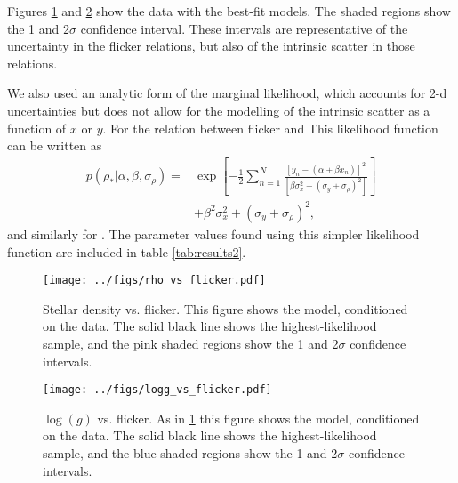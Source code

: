 Figures \ref{fig:rhostar} and \ref{fig:logg} show the data with the best-fit
models.
The shaded regions show the 1 and 2$\sigma$ confidence interval.
These intervals are representative of the uncertainty in the flicker relations,
but also of the intrinsic scatter in those relations.

We also used an analytic form of the marginal likelihood, which accounts for
2-d uncertainties but does not allow for the modelling of the intrinsic scatter
as a function of $x$ or $y$.
For the relation between flicker and \rhostar This likelihood function can be
written as
\begin{eqnarray}
	p(\rho_*|\alpha, \beta, \sigma_{\rho}) = &
	\exp \left[-\frac{1}{2} \sum_{n=1}^N\frac{[y_n-(\alpha + \beta x_n)]^2}
	{\left[\beta \sigma_x^2 + (\sigma_y + \sigma_{\rho})^2\right]}\right]
	\\ \nonumber
	& + \beta^2 \sigma_x^2 + (\sigma_y + \sigma_{\rho})^2,
\end{eqnarray}
and similarly for \logg.
The parameter values found using this simpler likelihood function are included
in table \ref{tab:results2}.

\begin{figure}
\begin{center}
\texttt{[image: ../figs/rho\_vs\_flicker.pdf]}
\caption{
Stellar density vs. flicker.
This figure shows the model, conditioned on the data.
The solid black line shows the highest-likelihood sample, and the pink shaded
regions show the 1 and 2$\sigma$ confidence intervals.}
\label{fig:rhostar}
\end{center}
\end{figure}

\begin{figure}
\begin{center}
\texttt{[image: ../figs/logg\_vs\_flicker.pdf]}
\caption{
$\log(g)$ vs. flicker.
As in \ref{fig:rhostar} this figure shows the model, conditioned on the data.
The solid black line shows the highest-likelihood sample, and the blue shaded
regions show the 1 and 2$\sigma$ confidence intervals.}
\label{fig:logg}
\end{center}
\end{figure}

